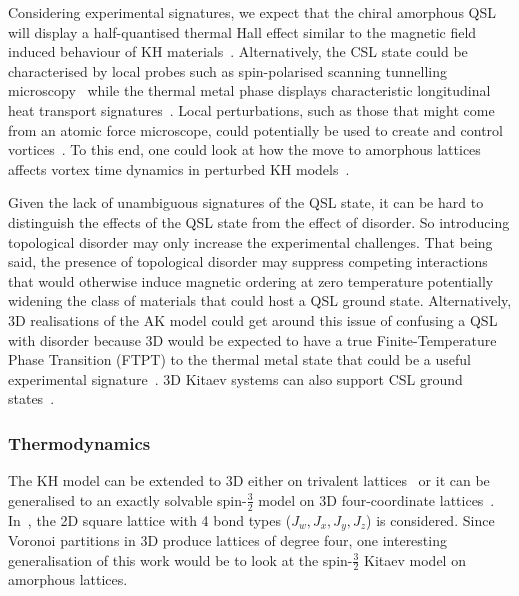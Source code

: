 Considering experimental signatures, we expect that the chiral amorphous QSL will display a half-quantised thermal Hall effect similar to the magnetic field induced behaviour of KH materials~\autocite{Kasahara2018,Yokoi2021,Yamashita2020,Bruin2022}. Alternatively, the CSL state could be characterised by local probes such as spin-polarised scanning tunnelling microscopy~\autocite{Feldmeier2020,Konig2020,Udagawa2021} while the thermal metal phase displays characteristic longitudinal heat transport signatures~\autocite{Beenakker2013}. Local perturbations, such as those that might come from an atomic force microscope, could potentially be used to create and control vortices~\autocite{jangVortexCreationControl2021}. To this end, one could look at how the move to amorphous lattices affects vortex time dynamics in perturbed KH models~\autocite{joyDynamicsVisonsThermal2022}.

Given the lack of unambiguous signatures of the QSL state, it can be hard to distinguish the effects of the QSL state from the effect of disorder. So introducing topological disorder may only increase the experimental challenges. That being said, the presence of topological disorder may suppress competing interactions that would otherwise induce magnetic ordering at zero temperature potentially widening the class of materials that could host a QSL ground state. Alternatively, 3D realisations of the AK model could get around this issue of confusing a QSL with disorder because 3D would be expected to have a true Finite-Temperature Phase Transition (FTPT) to the thermal metal state that could be a useful experimental signature~\autocite{eschmannThermodynamicClassificationThreedimensional2020,OBrienPRB2016}. 3D Kitaev systems can also support CSL ground states~\autocite{mishchenkoChiralSpinLiquids2020}.

\hypertarget{thermodynamics}{%
\subsubsection{Thermodynamics}\label{thermodynamics}}

The KH model can be extended to 3D either on trivalent lattices~\autocite{eschmannThermodynamicClassificationThreedimensional2020,OBrienPRB2016} or it can be generalised to an exactly solvable spin-\(\tfrac{3}{2}\) model on 3D four-coordinate lattices~\autocite{yaoAlgebraicSpinLiquid2009,wenQuantumOrderStringnet2003,ryuThreedimensionalTopologicalPhase2009,Baskaran2008,Nussinov2009,Yao2011,Chua2011,Natori2020,Chulliparambil2020,Chulliparambil2021,Seifert2020,WangHaoranPRB2021,Wu2009}. In~\autocite{yaoAlgebraicSpinLiquid2009}, the 2D square lattice with 4 bond types (\(J_w, J_x, J_y, J_z\)) is considered. Since Voronoi partitions in 3D produce lattices of degree four, one interesting generalisation of this work would be to look at the spin-\(\tfrac{3}{2}\) Kitaev model on amorphous lattices.

